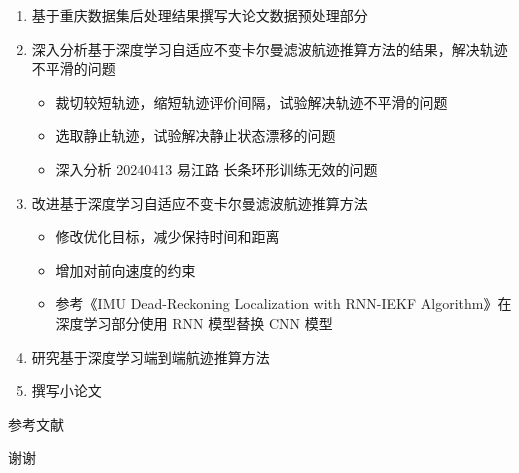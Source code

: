 \documentclass{beamer} %
\begin{document}
\begin{frame}[allowframebreaks]
    \begin{enumerate}

        \item 基于重庆数据集后处理结果撰写大论文数据预处理部分
        
        \item 深入分析基于深度学习自适应不变卡尔曼滤波航迹推算方法的结果，解决轨迹不平滑的问题
        \begin{itemize}
            \item 裁切较短轨迹，缩短轨迹评价间隔，试验解决轨迹不平滑的问题
            \item 选取静止轨迹，试验解决静止状态漂移的问题
            \item 深入分析 20240413 易江路 长条环形训练无效的问题  
        \end{itemize}

        \item 改进基于深度学习自适应不变卡尔曼滤波航迹推算方法
        \begin{itemize}
            \item 修改优化目标，减少保持时间和距离
            \item 增加对前向速度的约束
            \item 参考《IMU Dead-Reckoning Localization with RNN-IEKF Algorithm》在深度学习部分使用 RNN 模型替换 CNN 模型
        \end{itemize}

        \item 研究基于深度学习端到端航迹推算方法

        \item 撰写小论文

    \end{enumerate}
\end{frame}


\begin{frame}[allowframebreaks]{参考文献} %
	\printbibliography[heading=references]
\end{frame}


\begin{frame}
    \begin{center}
        {\Huge 谢谢}
    \end{center}
\end{frame}
\end{document}
